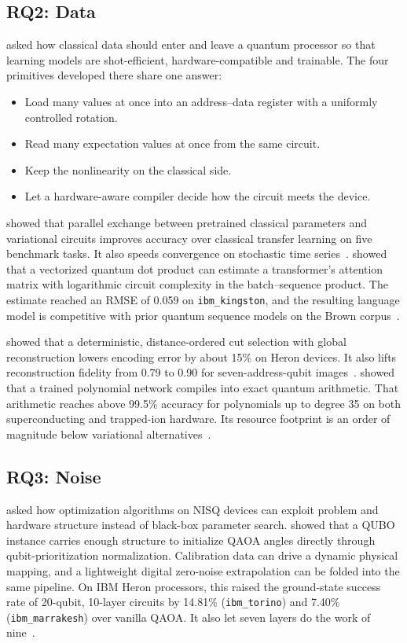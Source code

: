 \subsection{RQ2: Data}\label{sec:conclusion:rq2}

 asked how classical data should enter and leave a quantum processor so that learning models are shot-efficient, hardware-compatible and trainable. The four primitives developed there share one answer:
\begin{itemize}
  \item Load many values at once into an address--data register with a uniformly controlled rotation.
  \item Read many expectation values at once from the same circuit.
  \item Keep the nonlinearity on the classical side.
  \item Let a hardware-aware compiler decide how the circuit meets the device.
\end{itemize}

\qpie{} showed that parallel exchange between pretrained classical parameters and variational circuits improves accuracy over classical transfer learning on five benchmark tasks. It also speeds convergence on stochastic time series~\cite{guo2025qpie}. \vqt{} showed that a vectorized quantum dot product can estimate a transformer's attention matrix with logarithmic circuit complexity in the batch--sequence product. The estimate reached an RMSE of 0.059 on \texttt{ibm\_kingston}, and the resulting language model is competitive with prior quantum sequence models on the Brown corpus~\cite{guo2025vqt}.

\shardq{} showed that a deterministic, distance-ordered cut selection with global reconstruction lowers encoding error by about 15\% on Heron devices. It also lifts reconstruction fidelity from 0.79 to 0.90 for seven-address-qubit images~\cite{guo2025shardq}. \nnqa{} showed that a trained polynomial network compiles into exact quantum arithmetic. That arithmetic reaches above 99.5\% accuracy for polynomials up to degree 35 on both superconducting and trapped-ion hardware. Its resource footprint is an order of magnitude below variational alternatives~\cite{guo2026nnqa}.

\subsection{RQ3: Noise}\label{sec:conclusion:rq3}

 asked how optimization algorithms on NISQ devices can exploit problem and hardware structure instead of black-box parameter search. \deal{} showed that a QUBO instance carries enough structure to initialize QAOA angles directly through qubit-prioritization normalization. Calibration data can drive a dynamic physical mapping, and a lightweight digital zero-noise extrapolation can be folded into the same pipeline. On IBM Heron processors, this raised the ground-state success rate of 20-qubit, 10-layer circuits by 14.81\% (\texttt{ibm\_torino}) and 7.40\% (\texttt{ibm\_marrakesh}) over vanilla QAOA. It also let seven layers do the work of nine~\cite{guo2025deal}.

